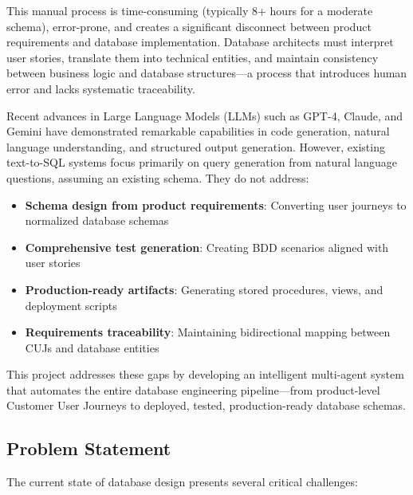 \documentclass[12pt,a4paper]{article}
\begin{document}
This manual process is time-consuming (typically 8+ hours for a moderate schema), error-prone, and creates a significant disconnect between product requirements and database implementation. Database architects must interpret user stories, translate them into technical entities, and maintain consistency between business logic and database structures—a process that introduces human error and lacks systematic traceability.

Recent advances in Large Language Models (LLMs) such as GPT-4, Claude, and Gemini have demonstrated remarkable capabilities in code generation, natural language understanding, and structured output generation. However, existing text-to-SQL systems focus primarily on query generation from natural language questions, assuming an existing schema. They do not address:

\begin{itemize}
\item \textbf{Schema design from product requirements}: Converting user journeys to normalized database schemas
\item \textbf{Comprehensive test generation}: Creating BDD scenarios aligned with user stories
\item \textbf{Production-ready artifacts}: Generating stored procedures, views, and deployment scripts
\item \textbf{Requirements traceability}: Maintaining bidirectional mapping between CUJs and database entities
\end{itemize}

This project addresses these gaps by developing an intelligent multi-agent system that automates the entire database engineering pipeline—from product-level Customer User Journeys to deployed, tested, production-ready database schemas.

\subsection{Problem Statement}

The current state of database design presents several critical challenges:
\end{document}
